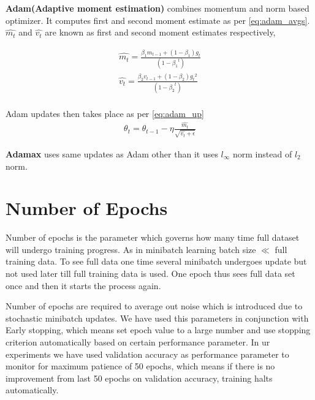 \noindent \textbf{Adam(Adaptive moment estimation)}\cite{adam} combines momentum and norm based optimizer. It computes first and second moment estimate as per \ref{eq:adam_avgs}. $\hat{m_t}$ and $\hat{v_t}$ are known as first and second moment estimates respectively, 

\begin{equation}\label{eq:adam_avgs}
\begin{aligned}
\hat{m_t}=\frac{\beta_1 m_{t-1}+(1-\beta_1)g_t}{(1-{\beta_1}^t)} \\
\hat{v_t}=\frac{\beta_2 v_{t-1}+(1-\beta_2){g_t}^2}{(1-{\beta_2}^t)}\\
\end{aligned}
\end{equation}

\noindent Adam updates then takes place as per \ref{eq:adam_up}
\begin{equation}\label{eq:adam_up}
\begin{aligned}
\theta_t=\theta_{t-1} - \eta\frac{\hat{m_t}}{\sqrt{\hat{v_t}+\epsilon}}
\end{aligned}
\end{equation}

\noindent \textbf{Adamax}\cite{adam} uses same updates as Adam other than it uses $l_{\infty}$ norm instead of $l_2$ norm.
%

\section{Number of Epochs}

Number of epochs is the parameter which governs how many time full dataset will undergo training progress. As in minibatch learning batch size $\ll$ full training data. To see full data one time several minibatch undergoes update but not used later till full training data is used. One epoch thus sees full data set once and then it starts the process again.

Number of epochs are required to average out noise which is introduced due to stochastic minibatch updates. 
We have used this parameters in conjunction with Early stopping, which means set epoch value to a large number and use stopping criterion automatically based on certain performance parameter. In ur experiments we have used validation accuracy as performance parameter to monitor for maximum patience of 50 epochs, which means if there is no improvement from last 50 epochs on validation accuracy, training halts automatically.


